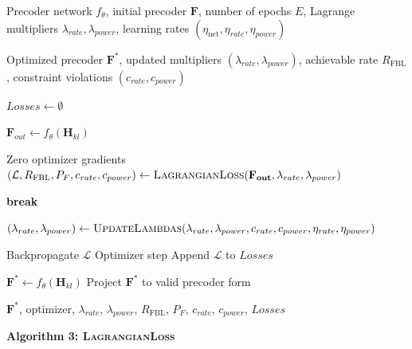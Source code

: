 \documentclass[a4paper, 12pt, onecolumn, journal, twoside, draftclsnofoot]{IEEEtran}
\begin{document}
\begin{algorithmic}[1]

\Require
Precoder network $f_\theta$, initial precoder $\mathbf{F}$, number of epochs $E$, Lagrange multipliers $\lambda_{rate}, \lambda_{power}$,
learning rates $(\eta_{\text{net}}, \eta_{rate}, \eta_{power})$

\Ensure
Optimized precoder $\mathbf{F}^*$, updated multipliers
$(\lambda_{rate}, \lambda_{power})$, achievable rate $R_{\mathrm{FBL}}$,
constraint violations $(c_{rate}, c_{power})$

\State $Losses \gets \emptyset$


    \State $\mathbf{F}_{out} \gets f_\theta(\mathbf{H}_{kl})$

    \State Zero optimizer gradients
    \State
    $(\mathcal{L},
    R_{\mathrm{FBL}},
    P_F,
    c_{rate},
    c_{power})
    \gets
    \textsc{LagrangianLoss}(\mathbf{F_{out}}, \lambda_{rate}, \lambda_{power})$

        \State \textbf{break}
    \EndIf

    \State
    $(\lambda_{rate}, \lambda_{power})
    \gets
    \textsc{UpdateLambdas}(\lambda_{rate}, \lambda_{power},
    c_{rate}, c_{power},
    \eta_{rate}, \eta_{power})$

    \State Backpropagate $\mathcal{L}$
    \State Optimizer step
    \State Append $\mathcal{L}$ to $Losses$

\EndFor

\State $\mathbf{F}^* \gets f_\theta(\mathbf{H}_{kl})$
\State Project $\mathbf{F}^*$ to valid precoder form 

\State \Return
$\mathbf{F}^*$, optimizer,
$\lambda_{rate}$, $\lambda_{power}$,
$R_{\mathrm{FBL}}$, $P_F$,
$c_{rate}$, $c_{power}$, $Losses$

\end{algorithmic}

\newpage
\noindent\textbf{Algorithm 3: \textsc{LagrangianLoss}}
\end{document}
